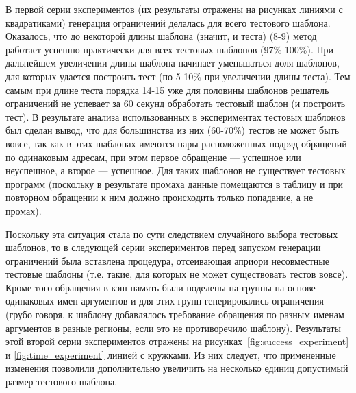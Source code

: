 В первой серии экспериментов (их результаты отражены на рисунках линиями с
квадратиками) генерация ограничений делалась для всего тестового шаблона.
Оказалось, что до некоторой длины шаблона (значит, и теста) (8-9) метод работает
успешно практически для всех тестовых шаблонов (97\%-100\%). При дальнейшем
увеличении длины шаблона начинает уменьшаться доля шаблонов, для которых удается
построить тест (по 5-10\% при увеличении длины теста). Тем самым при длине теста
порядка 14-15 уже для половины шаблонов решатель ограничений не успевает за 60
секунд обработать тестовый шаблон (и построить тест). В результате анализа использованных в
экспериментах тестовых шаблонов был сделан вывод, что для большинства из них
(60-70\%) тестов не может быть вовсе, так как в этих шаблонах имеются пары расположенных подряд обращений
по одинаковым адресам, при этом первое обращение --- успешное или неуспешное, а второе --- успешное. Для таких шаблонов не существует тестовых программ (поскольку в результате промаха данные помещаются в таблицу и при повторном обращении к ним должно происходить только попадание, а не промах).

Поскольку эта ситуация стала по сути следствием случайного выбора тестовых
шаблонов, то в следующей серии экспериментов перед запуском генерации
ограничений была вставлена процедура, отсеивающая априори несовместные тестовые
шаблоны (т.е. такие, для которых не может существовать тестов вовсе). Кроме того
обращения в кэш-память были поделены на группы на основе одинаковых имен
аргументов и для этих групп генерировались ограничения (грубо говоря, к шаблону
добавлялось требование обращения по разным именам аргументов в разные регионы,
если это не противоречило шаблону). Результаты этой второй серии экспериментов
отражены на рисунках~\ref{fig:success_experiment} и \ref{fig:time_experiment}
линией с кружками. Из них следует, что примененные изменения позволили
дополнительно увеличить на несколько единиц допустимый размер тестового шаблона.

